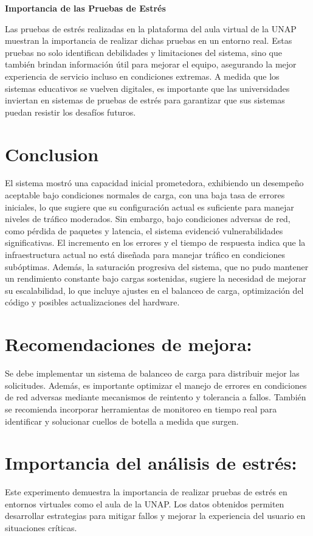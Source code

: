\documentclass{article}
\begin{document}
\textbf{Importancia de las Pruebas de Estrés}

Las pruebas de estrés realizadas en la plataforma del aula virtual de la UNAP muestran la importancia de realizar dichas pruebas en un entorno real. Estas pruebas no solo identifican debilidades y limitaciones del sistema, sino que también brindan información útil para mejorar el equipo, asegurando la mejor experiencia de servicio incluso en condiciones extremas. A medida que los sistemas educativos se vuelven digitales, es importante que las universidades inviertan en sistemas de pruebas de estrés para garantizar que sus sistemas puedan resistir los desafíos futuros.

\section{Conclusion}

El sistema mostró una capacidad inicial prometedora, exhibiendo un desempeño aceptable bajo condiciones normales de carga, con una baja tasa de errores iniciales, lo que sugiere que su configuración actual es suficiente para manejar niveles de tráfico moderados. Sin embargo, bajo condiciones adversas de red, como pérdida de paquetes y latencia, el sistema evidenció vulnerabilidades significativas. El incremento en los errores y el tiempo de respuesta indica que la infraestructura actual no está diseñada para manejar tráfico en condiciones subóptimas. Además, la saturación progresiva del sistema, que no pudo mantener un rendimiento constante bajo cargas sostenidas, sugiere la necesidad de mejorar su escalabilidad, lo que incluye ajustes en el balanceo de carga, optimización del código y posibles actualizaciones del hardware.

\section{Recomendaciones de mejora:}
Se debe implementar un sistema de balanceo de carga para distribuir mejor las solicitudes. Además, es importante optimizar el manejo de errores en condiciones de red adversas mediante mecanismos de reintento y tolerancia a fallos. También se recomienda incorporar herramientas de monitoreo en tiempo real para identificar y solucionar cuellos de botella a medida que surgen.
    
\section{Importancia del análisis de estrés:} Este experimento demuestra la importancia de realizar pruebas de estrés en entornos virtuales como el aula de la UNAP. Los datos obtenidos permiten desarrollar estrategias para mitigar fallos y mejorar la experiencia del usuario en situaciones críticas.

\printbibliography

\cite{Aggarwal2024854}
\cite{AguilarCastro1997203}
\cite{Azketa2021113}
\cite{Caram2012119}
\cite{Castro2007170}
\cite{Dzulkifly2025178}
\cite{Gómez-Baryolo2017}
\cite{Huang2024853}
\cite{Martínez2021343}
\cite{Rao20241026}
\cite{Saini2024}
\cite{Xavier2025276}
\cite{Zou2024}
\cite{Li20241827}
\cite{Terencio2023154}
\end{document}
